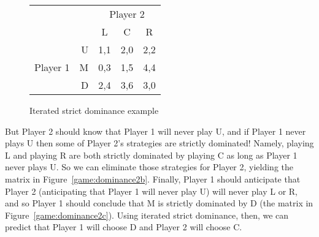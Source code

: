 \begin{figure}[b]
\begin{center}
\begin{tabular}{crccc}
& & \multicolumn{3}{c}{Player 2} \\ [.15cm]
& & L & C & R \\ \cline{3-5}
\multirow{3}{1.5cm}{Player 1}
& U & \multicolumn{1}{|c|}{1,1} & \multicolumn{1}{c}{2,0} & \multicolumn{1}{|c|}{2,2} \\ \cline{3-5}
& M & \multicolumn{1}{|c|}{0,3} & \multicolumn{1}{c}{1,5} & \multicolumn{1}{|c|}{4,4} \\ \cline{3-5}
& D & \multicolumn{1}{|c|}{2,4} & \multicolumn{1}{c}{3,6} & \multicolumn{1}{|c|}{3,0} \\ \cline{3-5}
\end{tabular}
\end{center}
\caption{Iterated strict dominance example}
\label{game:dominance1} %
\end{figure}



But Player 2 should know that Player 1 will never play U, and if Player 1 never plays U then some of Player 2's strategies are strictly dominated! Namely, playing L and playing R are both strictly dominated by playing C as long as Player 1 never plays U. So we can eliminate those strategies for Player 2, yielding the matrix in Figure~\ref{game:dominance2b}. Finally, Player 1 should anticipate that Player 2 (anticipating that Player 1 will never play U) will never play L or R, and so Player 1 should conclude that M is strictly dominated by D (the matrix in Figure~\ref{game:dominance2c}). Using iterated strict dominance, then, we can predict that Player 1 will choose D and Player 2 will choose C.



